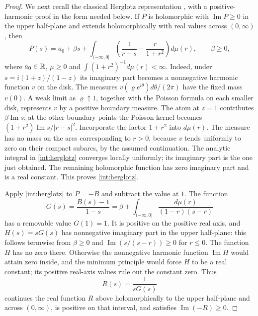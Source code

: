 \begin{proof}
We next recall the classical Herglotz representation
\cite{Herglotz1911}, with a positive-harmonic proof in the form needed
below.  If $P$ is holomorphic with $\operatorname{Im}P\ge0$ in
the upper half-plane and extends holomorphically with real values
across $(0,\infty)$, then
\begin{equation}\label{int:herglotz}
 P(s)=a_0+\beta s+\int_{(-\infty,0]}
 \left(\frac1{r-s}-\frac{r}{1+r^2}\right)d\mu(r),
 \qquad \beta\ge0,
\end{equation}
where $a_0\in\mathbb R$, $\mu\ge0$ and
$\int(1+r^2)^{-1}d\mu(r)<\infty$.
Indeed, under $s=i(1+z)/(1-z)$ its imaginary part becomes a
nonnegative harmonic function $v$ on the disk.  The measures
$v(\varrho e^{i\theta})d\theta/(2\pi)$ have the fixed mass $v(0)$.
A weak limit as $\varrho\uparrow1$, together with the Poisson formula
on each smaller disk, represents $v$ by a positive boundary measure.
The atom at $z=1$ contributes $\beta\operatorname{Im}s$; at the
other boundary points the Poisson kernel becomes
$(1+r^2)\operatorname{Im}s/|r-s|^2$.  Incorporate the factor
$1+r^2$ into $d\mu(r)$.  The measure has no mass on the arcs
corresponding to $r>0$, because $v$ tends uniformly to zero on their
compact subarcs, by the assumed continuation.  The analytic
integral in \eqref{int:herglotz} converges locally uniformly; its
imaginary part is the one just obtained.  The remaining holomorphic
function has zero imaginary part and is a real constant.  This
proves \eqref{int:herglotz}.

Apply \eqref{int:herglotz} to $P=-B$ and subtract the value at $1$.
The function
\begin{equation}\label{int:G}
 G(s)=\frac{B(s)-1}{1-s}
 =\beta+\int_{(-\infty,0]}\frac{d\mu(r)}{(1-r)(s-r)}
\end{equation}
has a removable value $G(1)=1$.  It is positive on the positive real
axis, and $H(s)=sG(s)$ has nonnegative imaginary part in the upper
half-plane: this follows termwise from $\beta\ge0$ and
$\operatorname{Im}(s/(s-r))\ge0$ for $r\le0$.
The function $H$ has no zero there.  Otherwise the nonnegative
harmonic function $\operatorname{Im}H$ would attain zero inside,
and the minimum principle would force $H$ to be a real constant;
its positive real-axis values rule out the constant zero.
Thus
\[
 R(s)=\frac1{sG(s)}
\]
continues the real function $R$ above holomorphically to the upper
half-plane and across $(0,\infty)$,
is positive on that interval, and satisfies
$\operatorname{Im}(-R)\ge0$.


\end{proof}
